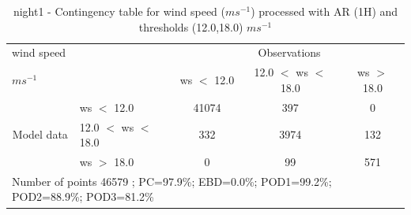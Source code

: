 \begin{table}[h!]
\begin{center}
\begin{tabular}{llccc}
\hline
{wind speed}                                       &                                                    & \multicolumn{3}{c}{Observations}                 \\
{$m s^{-1}$}                                       &                             & ws $<$ 12.0   & 12.0 $<$ ws $<$ 18.0 & ws $>$ 18.0 \\
\hline
\multicolumn{1}{c}{\multirow{3}{*}{Model data}}  & ws $<$ 12.0             & 41074                & 397                       & 0              \\
                                                 & 12.0  $<$ ws $<$ 18.0 & 332                & 3974                       & 132              \\
                                                 & ws $>$ 18.0             & 0                & 99                       & 571              \\
\hline 
\multicolumn{5}{l}{ Number of points        46579 ; PC=97.9\%; EBD=0.0\%; POD1=99.2\%; POD2=88.9\%; POD3=81.2\%}                 \\
\end{tabular}
\end{center}
\caption{night1 - Contingency table for  wind speed ($m s^{-1}$) processed with AR (1H) and thresholds (12.0,18.0) $m s^{-1}$}
\label{tab:contingencywsAFT:night1}
\end{table}
